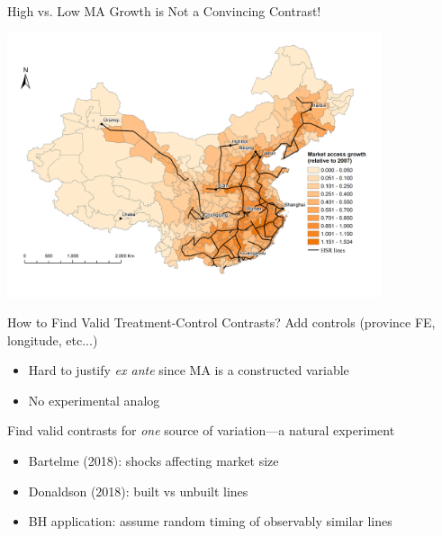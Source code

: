 \documentclass{beamer}
\begin{document}
\begin{frame}[t,label=LinePanel]{High vs. Low MA Growth is Not a Convincing Contrast!}
	\begin{center}
	\includegraphics[trim={1cm 0.5cm 0.5cm 1cm},clip,width=11cm]{lecture_includes/Line_panel2016.png}
	\end{center}
\end{frame}

\begin{frame}[label=HSR]{How to Find Valid Treatment-Control Contrasts?}
Add controls (province FE, longitude, etc...)
\vspace{0.05cm}
	\begin{itemize}
	\item Hard to justify \emph{ex ante} since MA is a constructed variable 
	\vspace{0.1cm}
	\item No experimental analog
	\end{itemize}
\vspace{0.4cm}\pause
Find valid contrasts for \emph{one} source of variation---a natural experiment
\vspace{0.05cm}
	\begin{itemize}
	\item Bartelme (2018): shocks affecting market size
	\vspace{0.1cm}
	\item Donaldson (2018): built vs unbuilt lines
	\vspace{0.1cm}
	\item BH application: assume random timing of observably similar lines 
	\end{itemize}
\end{frame}
\end{document}
